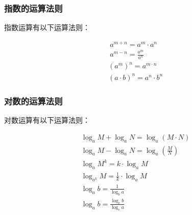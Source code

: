 \documentclass[UTF8]{ctexart}
\begin{document}
\subsubsection{指数的运算法则}
    指数运算有以下运算法则：
    \begin{large}
        \begin{align*}
            &~a^{m+n}=a^m\cdot a^n\\[6mm]
            &~a^{m-n}=\frac{a^m}{a^n}\\[6mm]
            &\left(a^m\right)^n=a^{m\cdot n}\\[6mm]
            &\left(a\cdot b\right)^n=a^n\cdot b^n
        \end{align*}
    \end{large}

\subsubsection{对数的运算法则}
    对数运算有以下运算法则：
    \begin{large}
        \begin{align*}
            &\log_{a}M+\log_{a}N=\log_{a}(M\cdot N)\\[7mm]
            &\log_{a}M-\log_{a}N=\log_{a}(\frac{M}{N})\\[7mm]
            &\log_{a}M^{k}=k\cdot\log_{a}{M}\\[7mm]
            &\log_{a^k}M=\frac{1}{k}\cdot\log_{a}{M}\\[7mm]
            &\log_{a}{b}=\frac{1}{\log_{b}{a}}\\[7mm]
            &\log_{a}{b}=\frac{\log_{c}{b}}{\log_{c}{a}}
        \end{align*}
    \end{large}
    
\newpage
\end{document}
